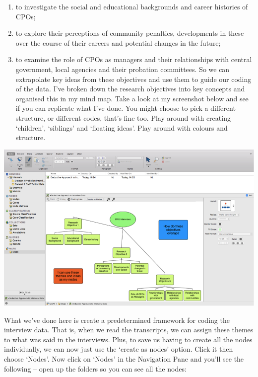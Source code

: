 \documentclass[]{book}
\providecommand{\tightlist}{%
  \setlength{\itemsep}{0pt}\setlength{\parskip}{0pt}}
\theoremstyle{definition}
\theoremstyle{definition}
\theoremstyle{definition}
\theoremstyle{remark}
\begin{document}
\begin{enumerate}
\def\labelenumi{\arabic{enumi}.}
\tightlist
\item
  to investigate the social and educational backgrounds and career
  histories of CPOs;
\item
  to explore their perceptions of community penalties, developments in
  these over the course of their careers and potential changes in the
  future;
\item
  to examine the role of CPOs as managers and their relationships with
  central government, local agencies and their probation committees. So
  we can extrapolate key ideas from these objectives and use them to
  guide our coding of the data. I've broken down the research objectives
  into key concepts and organised this in my mind map. Take a look at my
  screenshot below and see if you can replicate what I've done. You
  might choose to pick a different structure, or different codes, that's
  fine too. Play around with creating `children', `siblings' and
  `floating ideas'. Play around with colours and structure.
\end{enumerate}

\includegraphics{imgs/qual_40.png}

What we've done here is create a predetermined framework for coding the
interview data. That is, when we read the transcripts, we can assign
these themes to what was said in the interviews. Plus, to save us having
to create all the nodes individually, we can now just use the `create as
nodes' option. Click it then choose `Nodes'. Now click on `Nodes' in the
Navigation Pane and you'll see the following -- open up the folders so
you can see all the nodes:
\end{document}
